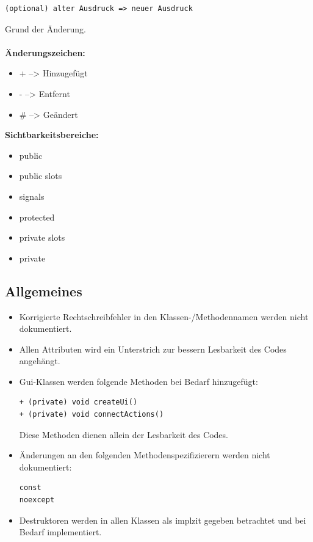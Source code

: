 \documentclass{scrartcl}
\begin{document}
{\begin{verbatim}
(optional) alter Ausdruck => neuer Ausdruck
\end{verbatim}
Grund der Änderung.\\
\\
\bigskip
\textbf{Änderungszeichen:}
\begin{itemize}
\item[] + \hspace{5mm}-->\hspace{5mm} Hinzugefügt
\item[] -  \hspace{5mm}-->\hspace{5mm} Entfernt
\item[] \# \hspace{5mm}-->\hspace{5mm} Geändert
\end{itemize}
\bigskip
\textbf{Sichtbarkeitsbereiche:}
\begin{itemize}
\item public
\item public slots
\item signals
\item protected
\item private slots
\item private
\end{itemize}
\newpage
\subsection{Allgemeines}
\bigskip
\begin{itemize}
\item Korrigierte Rechtschreibfehler in den Klassen-/Methodennamen werden nicht dokumentiert.
\item Allen Attributen wird ein Unterstrich zur bessern Lesbarkeit des Codes angehängt.
\item Gui-Klassen werden folgende Methoden bei Bedarf hinzugefügt:
\begin{verbatim}
+ (private) void createUi()
+ (private) void connectActions()
\end{verbatim}
Diese Methoden dienen allein der Lesbarkeit des Codes.
\item Änderungen an den folgenden Methodenspezifizierern werden nicht dokumentiert:
\begin{verbatim}
const
noexcept
\end{verbatim}
\item Destruktoren werden in allen Klassen als implzit gegeben betrachtet und bei Bedarf implementiert.
\end{itemize}
\newpage
}
\end{document}
